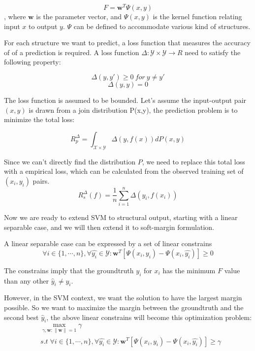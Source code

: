 $$ F = \mathbf{w}^{T}\Psi(x,y)$$, 
where $\mathbf{w}$ is the parameter vector, and $\Psi(x,y)$ is the kernel function relating input $x$ to output $y$. $\Psi$ can be defined to accommodate various kind of structures. 

For each structure we want to predict, a loss function that measures the accuracy of of a prediction is required. A loss function $\Delta:\mathcal{Y}\times\mathcal{Y}\rightarrow R$ need to satisfy the following property:

$$\Delta(y, y') \geq 0 \ for\ y \neq y'$$
$$\Delta(y, y) = 0 $$

The loss function is assumed to be bounded. Let's assume the input-output pair $(x,y)$ is drawn from a join distribution P(x,y), the prediction problem is to minimize the total loss:

$$R_p^\Delta = \int_{\mathcal{X} \times \mathcal{Y}} \Delta (y, f(x))dP(x,y)$$

Since we can't directly find the distribution $P$, we need to replace this total loss with a empirical loss, which can be calculated from the observed training set of $(x_i, y_i)$ pairs.
$$R_s^\Delta(f) = \frac{1}{n}\sum^n_{i=1}\Delta(y_i, f(x_i))$$

Now we are ready to extend SVM to structural output, starting with a linear separable case, and we will then extend it to soft-margin formulation. 

A linear separable case can be expressed by a set of linear constrains
$$\forall i \in \{1,\cdots,n\}, \forall \hat{y_i}\in\mathcal{Y}: \mathbf{w}^T [\Psi(x_i, y_i) - \Psi(x_i, \hat{y_i})]\geq 0$$

The constrains imply that the groundtruth $y_i$ for $x_i$ has the minimum $F$ value than any other $\hat{y}_i \neq {y_i}$.

However, in the SVM context, we want the solution to have the largest margin possible. So we want to maximize the margin between the groundtruth and the second best $\hat{y}_i$, the above linear constrains will become this optimization problem:
$$
\begin{aligned}
& \max_{\gamma, \mathbf{w}:\|\mathbf{w}\| = 1} \gamma \\
& s.t \; \forall i \in \{1,\cdots,n\}, \forall \hat{y_i} \in\mathcal{Y}: \mathbf{w}^T [\Psi(x_i, y_i) - \Psi(x_i, \hat{y_i})] \geq \gamma\\
\end{aligned}
$$

